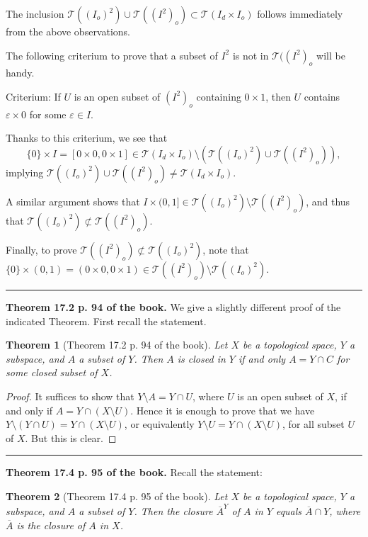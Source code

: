 \documentclass[12pt,letterpaper]{article}
\newtheorem{thm}{Theorem}%
\newcommand{\hs}{\bigskip\hrule\medskip}
\newcommand{\mc}{\mathcal}
\newcommand{\noi}{\noindent}%
\newcommand{\sm}{\setminus}
\begin{document}
The inclusion $\mc T((I_o)^2)\cup\mc T((I^2)_o)\subset\mc T(I_d\times I_o)$ follows immediately from the above observations. 

The following criterium to prove that a subset of $I^2$ is not in $\mc T((I^2)_o$ will be handy. 

\noi Criterium: If $U$ is an open subset of $(I^2)_o$ containing $0\times1$, then $U$ contains $\varepsilon\times0$ for some $\varepsilon\in I$. 

Thanks to this criterium, we see that 
$$
\{0\}\times I=[0\times0,0\times1]\in\mc T(I_d\times I_o)\sm(\mc T((I_o)^2)\cup\mc T((I^2)_o)),
$$ 
implying $\mc T((I_o)^2)\cup\mc T((I^2)_o)\ne\mc T(I_d\times I_o)$. 

A similar argument shows that $I\times(0,1]\in\mc T((I_o)^2)\sm\mc T((I^2)_o)$, and thus that $\mc T((I_o)^2)\not\subset\mc T((I^2)_o)$.  

Finally, to prove $\mc T((I^2)_o)\not\subset\mc T((I_o)^2)$, note that $\{0\}\times(0,1)=(0\times0,0\times1)\in\mc T((I^2)_o)\sm\mc T((I_o)^2)$. 

\hs


\noi\textbf{Theorem 17.2 p. 94 of the book.} We give a slightly different proof of the indicated Theorem. First recall the statement. 

\begin{thm}[Theorem 17.2 p. 94 of the book]\label{T17.2} 
Let $X$ be a topological space, $Y$ a subspace, and $A$ a subset of $Y$. Then $A$ is closed in $Y$ if and only $A=Y\cap C$ for some closed subset of $X$. 
\end{thm} 

\begin{proof} 
It suffices to show that $Y\sm A=Y\cap U$, where $U$ is an open subset of $X$, if and only if $A=Y\cap(X\sm U)$. Hence it is enough to prove that we have $Y\sm(Y\cap U)=Y\cap(X\sm U)$, or equivalently $Y\sm U=Y\cap(X\sm U)$, for all subset $U$ of $X$. But this is clear. 
\end{proof}

\hrule\medskip

\noi\textbf{Theorem 17.4 p. 95 of the book.} Recall the statement: 

\begin{thm}[Theorem 17.4 p. 95 of the book] 
Let $X$ be a topological space, $Y$ a subspace, and $A$ a subset of $Y$. Then the closure $\overline A^Y$ of $A$ in $Y$ equals $\overline A\cap Y$, where $\overline A$ is the closure of $A$ in $X$.
\end{thm} 
\end{document}
